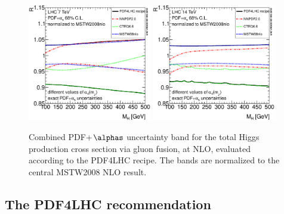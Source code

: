 \begin{figure}
\begin{center}
  \includegraphics[width=0.48\textwidth]{YRHXS_PDF/YRHXS_PDF_6}
  \includegraphics[width=0.48\textwidth]{YRHXS_PDF/YRHXS_PDF_7}
\end{center}
\vspace{-0.6cm}
\caption{Combined PDF+$\alphas$ uncertainty band
for the total Higgs production cross section via gluon fusion,
at NLO,
evaluated according to the PDF4LHC recipe.
The bands are normalized to the central MSTW2008 NLO result.}
\vspace{-0.6cm}
\label{nloenvelope}
\end{figure}

\subsection{The PDF4LHC recommendation}
\label{sec:pdf4lhcreco}

